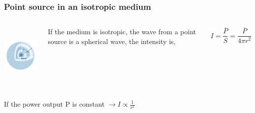 \documentclass[]{beamer}
\begin{document}
\begin{frame}
\frametitle{Point source in an isotropic medium}



   \begin{columns}[c]
   \column{2in}  %
  
\pause

 \begin{center}
  \includegraphics[height=1.2in]{images4/8.jpg}
\end{center}

   \column{2.4in}

\pause


If the medium is isotropic, the wave from a point source is
a spherical wave, the intensity is,

\pause

\begin{equation}
I=\frac{\overline P}{S}=\frac{\overline P}{4\pi r^2}
\end{equation}


   \end{columns}

\pause

If the power output P is constant $\rightarrow I\propto \frac{1}{r^2}$
\vspace{2mm}


  \end{frame}

\end{document}
